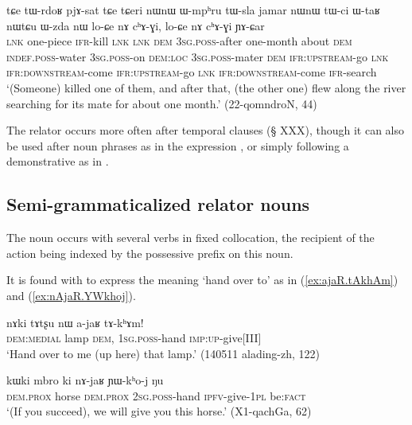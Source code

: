 \begin{exe}
\ex \label{ex:nWnW.Wmphru.tWsla}
 \gll tɕe tɯ-rdoʁ pjɤ-sat tɕe tɕeri nɯnɯ ɯ-mpʰru tɯ-sla jamar nɯnɯ tɯ-ci ɯ-taʁ nɯtɕu ɯ-zda nɯ lo-ɕe nɤ cʰɤ-ɣi, lo-ɕe nɤ cʰɤ-ɣi ɲɤ-ɕar \\
\textsc{lnk} one-piece \textsc{ifr}-kill \textsc{lnk} \textsc{lnk} \textsc{dem} \textsc{3sg}.\textsc{poss}-after one-month about \textsc{dem} \textsc{indef}.\textsc{poss}-water \textsc{3sg}.\textsc{poss}-on \textsc{dem}:\textsc{loc} \textsc{3sg}.\textsc{poss}-mater \textsc{dem} \textsc{ifr}:\textsc{upstream}-go \textsc{lnk} \textsc{ifr}:\textsc{downstream}-come  \textsc{ifr}:\textsc{upstream}-go \textsc{lnk} \textsc{ifr}:\textsc{downstream}-come \textsc{ifr}-search \\
\glt `(Someone) killed one of them, and after that, (the other one) flew along the river searching for its mate for about one month.' (22-qomndroN, 44)
\end{exe}

The relator  occurs more often after temporal clauses (§ XXX), though it can also be used after noun phrases as in the expression , or simply following a demonstrative as in .

\subsection{Semi-grammaticalized relator nouns} \label{sec:semi.grammaticalized.relator} 
The noun  occurs with several verbs in fixed collocation, the recipient of the action being indexed by the possessive prefix on this noun.

It is found with  to express the meaning `hand over to' as in (\ref{ex:ajaR.tAkhAm}) and (\ref{ex:nAjaR.YWkhoj}).

\begin{exe}
\ex \label{ex:ajaR.tAkhAm}
\gll nɤki tɤtʂu nɯ a-jaʁ tɤ-kʰɤm! \\
\textsc{dem}:\textsc{medial} lamp \textsc{dem}, \textsc{1sg}.\textsc{poss}-hand \textsc{imp}:\textsc{up}-give[III] \\
\glt `Hand over to me (up here) that lamp.' (140511 alading-zh, 122)
\end{exe}

\begin{exe}
\ex \label{ex:nAjaR.YWkhoj}
\gll kɯki mbro ki nɤ-jaʁ ɲɯ-kʰo-j ŋu \\
\textsc{dem}.\textsc{prox} horse \textsc{dem}.\textsc{prox} \textsc{2sg}.\textsc{poss}-hand \textsc{ipfv}-give-\textsc{1pl} be:\textsc{fact} \\
\glt  `(If you succeed), we will give you this horse.'  (X1-qachGa, 62)
\end{exe}

